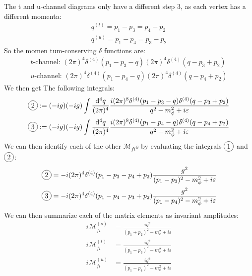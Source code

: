 \documentclass[12pt]{article}
\newcommand{\veps}{\varepsilon}
\newcommand{\circled}[1]{\tikz[baseline=(char.base)]{
    \node[shape=circle,draw,inner sep=2pt](char){#1};}}
\begin{document}
The t and u-channel diagrams only have a different step 3, as each vertex has a different momenta:
\begin{gather*}
  q^{(t)}=p_1-p_3=p_4-p_2\\
  q^{(u)}=p_1-p_4=p_3-p_2
\end{gather*}
So the momen
tum-conserving $\delta$ functions are:
\begin{align*}
  t\text{-channel: }
  (2\pi)^4\delta^{(4)}(p_1-p_3-q)(2\pi)^4\delta^{(4)}(q-p_3+p_2)\\
  u\text{-channel: }
  (2\pi)^4\delta^{(4)}(p_1-p_4-q)(2\pi)^4\delta^{(4)}(q-p_4+p_2)
\end{align*}
We then get The following integrals:
\begin{align*}
  \circled{2}&:= (-ig)(-ig)\int\frac{\dd[4]{q}}{(2\pi)^4}
  \frac{i(2\pi)^8\delta^{(4)}(p_1-p_3-q)\delta^{(4)}(q-p_3+p_2)}
  {q^2-m_\phi^2+i\veps}\\
  \circled{3}&:= (-ig)(-ig)\int\frac{\dd[4]{q}}{(2\pi)^4}
  \frac{i(2\pi)^8\delta^{(4)}(p_1-p_4-q)\delta^{(4)}(q-p_4+p_2)}
  {q^2-m_\phi^2+i\veps}
\end{align*}
We can then identify each of the other $\mathcal{M}_{fi}$s by evaluating the integrals $\circled{1}$ and $\circled{2}$:
\begin{align*}
  \circled{2} = -i(2\pi)^4\delta^{(4)}(p_1-p_3-p_4+p_2)
  \frac{g^2}{(p_1-p_3)^2-m^2_\phi+i\veps}
  \\
  \circled{3} = -i(2\pi)^4\delta^{(4)}(p_1-p_4-p_3+p_2)
  \frac{g^2}{(p_1-p_4)^2-m^2_\phi+i\veps}
\end{align*}
We can then summarize each of the matrix elements as invariant amplitudes:
\begin{equation}
  \label{eq:mels}
  \boxed{\begin{aligned}
      i\mathcal{M}^{(s)}_{fi}&=\frac{ig^2}{(p_1+p_2)^2-m^2_\phi+i\veps}\\
      i\mathcal{M}^{(t)}_{fi}&=\frac{ig^2}{(p_1-p_3)^2-m^2_\phi+i\veps}\\
      i\mathcal{M}^{(u)}_{fi}&=\frac{ig^2}{(p_1-p_4)^2-m^2_\phi+i\veps}
  \end{aligned}}
\end{equation}
\end{document}
